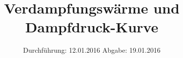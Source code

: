 

\subject{VERSUCH NUMMER V302}
\title{Verdampfungswärme und Dampfdruck-Kurve}
\date{
  Durchführung: 12.01.2016
  \hspace{3em}
  Abgabe: 19.01.2016
}



\maketitle
\thispagestyle{empty}
\tableofcontents
\newpage







\printbibliography


